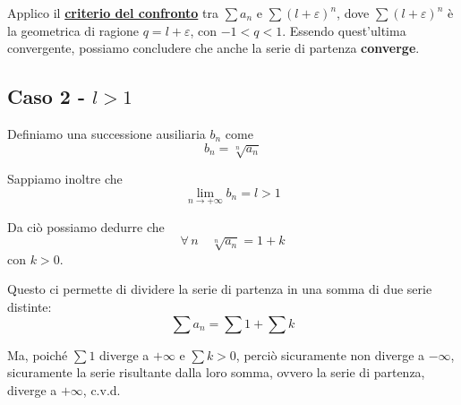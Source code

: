 \documentclass[../../dimostrazioni]{subfiles}
\begin{document}
                Applico il \textbf{\hyperref[serieconfronto]{criterio del confronto}} tra \(\sum a_n\) e \(\sum(l + \varepsilon)^n\),
                dove \(\sum(l + \varepsilon)^n\) è la geometrica di ragione \(q = l + \varepsilon\), con \(-1 < q < 1\).
                Essendo quest'ultima convergente, possiamo concludere che anche la serie di partenza \textbf{converge}.

            \subsection*{Caso 2 - \(l > 1\)}

                Definiamo una successione ausiliaria \(b_n\) come
                \[ b_n = \sqrt[n]{a_n} \]

                Sappiamo inoltre che
                \[ \lim_{n \to +\infty}b_n = l > 1 \]

                Da ciò possiamo dedurre che
                \[\forall \, n \quad \sqrt[n]{a_n} = 1 + k\]
                con \(k > 0\).

                Questo ci permette di dividere la serie di partenza in una somma di due serie distinte:
                \[\sum a_n = \sum 1 + \sum k\]

                Ma, poiché \(\sum 1\) diverge a \(+ \infty\) e \(\sum k > 0\), perciò sicuramente non diverge a \(- \infty\),
                sicuramente la serie risultante dalla loro somma, ovvero la serie di partenza, diverge a \(+ \infty\), c.v.d.
\end{document}
